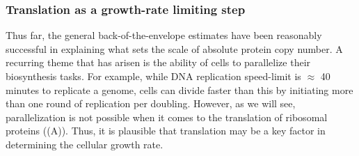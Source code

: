 \subsubsection{Translation as a growth-rate limiting step}
Thus far, the general back-of-the-envelope estimates have been
reasonably successful in explaining what sets the scale of absolute protein copy
number. A recurring theme that has arisen is the ability of cells to parallelize
their biosynthesis tasks. For example, while DNA replication speed-limit is
$\approx$ 40 minutes to replicate a genome, cells can divide faster than this by
initiating more than one round of replication per doubling. However, as we will
see, parallelization is not possible when it comes to the translation of
ribosomal proteins ((A)). Thus, it is plausible that  translation may be a key factor in
determining the cellular growth rate.


%

